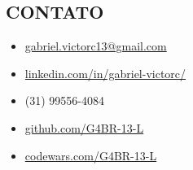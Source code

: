 \begin{framed}
    \section{CONTATO}
    \begin{itemize}[itemsep=1ex]
      \item {\Large{}} \href{mailto:gabriel.victorc13@gmail.com}{gabriel.victorc13@gmail.com}
      \item {\Large{}} \href{https://linkedin.com/in/gabriel-victorc/}{linkedin.com/in/gabriel-victorc/}
      \item {\Large{}} (31) 99556-4084
      \item {\Large{}} \href{https://github.com/G4BR-13-L}{github.com/G4BR-13-L}
      \item {\Large{}} \href{https://www.codewars.com/users/G4BR-%3E13-L}{codewars.com/G4BR-13-L}
    \end{itemize}
  \end{framed}